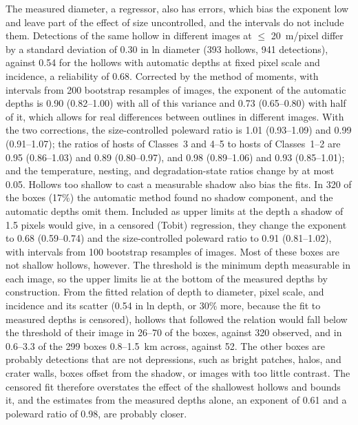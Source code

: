 \documentclass{planetary}
\begin{document}
The measured diameter, a regressor, also has errors, which bias the exponent low and leave part of the effect of size uncontrolled, and the intervals do not include them. Detections of the same hollow in different images at $\leq$ 20~m/pixel differ by a standard deviation of 0.30 in ln diameter (393 hollows, 941 detections), against 0.54 for the hollows with automatic depths at fixed pixel scale and incidence, a reliability of 0.68. Corrected by the method of moments, with intervals from 200 bootstrap resamples of images, the exponent of the automatic depths is 0.90 (0.82--1.00) with all of this variance and 0.73 (0.65--0.80) with half of it, which allows for real differences between outlines in different images. With the two corrections, the size-controlled poleward ratio is 1.01 (0.93--1.09) and 0.99 (0.91--1.07); the ratios of hosts of Classes~3 and 4--5 to hosts of Classes~1--2 are 0.95 (0.86--1.03) and 0.89 (0.80--0.97), and 0.98 (0.89--1.06) and 0.93 (0.85--1.01); and the temperature, nesting, and degradation-state ratios change by at most 0.05. Hollows too shallow to cast a measurable shadow also bias the fits. In 320 of the boxes (17\%) the automatic method found no shadow component, and the automatic depths omit them. Included as upper limits at the depth a shadow of 1.5 pixels would give, in a censored (Tobit) regression, they change the exponent to 0.68 (0.59--0.74) and the size-controlled poleward ratio to 0.91 (0.81--1.02), with intervals from 100 bootstrap resamples of images. Most of these boxes are not shallow hollows, however. The threshold is the minimum depth measurable in each image, so the upper limits lie at the bottom of the measured depths by construction. From the fitted relation of depth to diameter, pixel scale, and incidence and its scatter (0.54 in ln depth, or 30\% more, because the fit to measured depths is censored), hollows that followed the relation would fall below the threshold of their image in 26--70 of the boxes, against 320 observed, and in 0.6--3.3 of the 299 boxes 0.8--1.5~km across, against 52. The other boxes are probably detections that are not depressions, such as bright patches, halos, and crater walls, boxes offset from the shadow, or images with too little contrast. The censored fit therefore overstates the effect of the shallowest hollows and bounds it, and the estimates from the measured depths alone, an exponent of 0.61 and a poleward ratio of 0.98, are probably closer.
\end{document}
